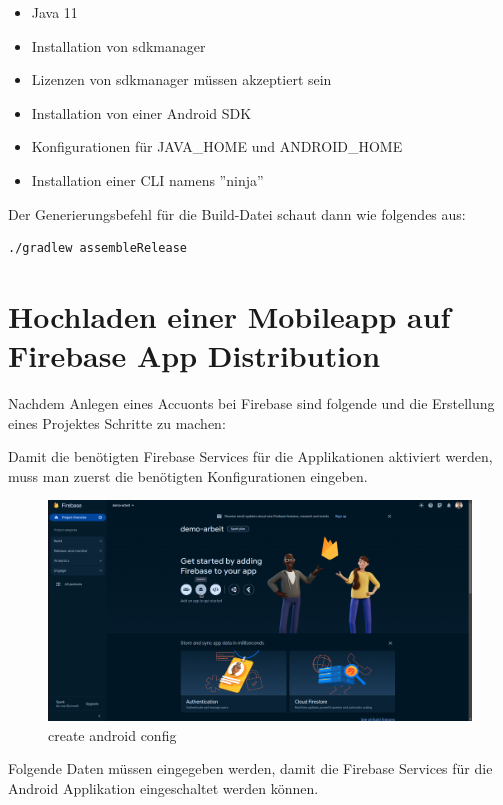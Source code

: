 \begin{itemize}
  \item Java 11
  \item Installation von sdkmanager
  \item Lizenzen von sdkmanager müssen akzeptiert sein
  \item Installation von einer Android SDK
  \item Konfigurationen für JAVA\_HOME und ANDROID\_HOME
  \item Installation einer CLI namens ''ninja''
\end{itemize}

Der Generierungsbefehl für die Build-Datei schaut dann wie folgendes aus:

\begin{lstlisting}[language=bash,caption=generate apk]
 ./gradlew assembleRelease
 \end{lstlisting}





\section{Hochladen einer Mobileapp auf Firebase App Distribution}

Nachdem Anlegen eines Accuonts bei Firebase sind folgende und die Erstellung eines Projektes Schritte zu machen:

Damit die benötigten Firebase Services für die Applikationen aktiviert werden, muss man zuerst die benötigten Konfigurationen eingeben.
\begin{figure}[H]
  \includegraphics[width=\textwidth]{./pics/firebase1.png}
  \caption{create android config}
\end{figure}


Folgende Daten müssen eingegeben werden, damit die Firebase Services für die Android Applikation eingeschaltet werden können.

